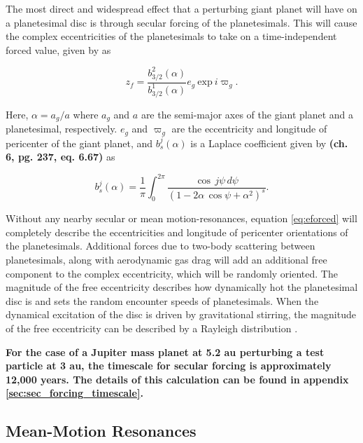 \documentclass[fleqn,usenatbib]{mnras}
\begin{document}
The most direct and widespread effect that a perturbing giant planet will have on a planetesimal disc is through secular forcing of the planetesimals. This will 
cause the complex eccentricities of the planetesimals to take on a time-independent 
forced value, given by \citep{1999ApJ...527..918W} as

\begin{equation}\label{eq:eforced}
	z_{f} = \frac{b^{2}_{3/2} (\alpha)}{b^{1}_{3/2} (\alpha)} e_{g} ~ \mathrm{exp} ~ i \varpi_{g}.
\end{equation}

\noindent Here, $\alpha = a_{g} / a$ where $a_{g}$ and $a$ are the semi-major axes of the giant planet and a planetesimal, 
respectively. $e_{g}$ and $\varpi_{g}$ are the eccentricity and
longitude of pericenter of the giant planet, and $b^{j}_{s} (\alpha)$ is a 
Laplace coefficient given by \citep{1999ssd..book.....M} \textbf{(ch. 6, pg. 237, eq. 6.67)} as

\begin{equation}\label{eq:lap}
	b_{s}^{j}(\alpha) = \frac{1}{\pi} \int_{0}^{2 \pi} \frac{\cos \, j \psi \, d \psi}{\left( 1 - 2 \alpha \, \cos \psi + \alpha^2 \right)^{s}}.
\end{equation}

Without any nearby secular or mean motion-resonances, equation \ref{eq:eforced} will completely describe the eccentricities and longitude of  
pericenter orientations of the planetesimals. Additional forces due to two-body scattering between planetesimals, along with 
aerodynamic gas drag will add an additional free component to the complex eccentricity, which will be randomly oriented. The 
magnitude of the free eccentricity describes how dynamically hot the planetesimal disc is and sets the random encounter speeds of 
planetesimals. When the dynamical excitation of the disc is driven by gravitational stirring, the magnitude of the free eccentricity can 
be described by a Rayleigh distribution \citep{1992Icar...96..107I}.

\textbf{For the case of a Jupiter mass planet at 5.2 au perturbing a test particle at 3 au, the timescale for secular forcing is approximately 12,000 years. The details of this calculation
can be found in appendix \ref{sec:sec_forcing_timescale}.}

\subsection{Mean-Motion Resonances}\label{sec:mmr}
\end{document}
